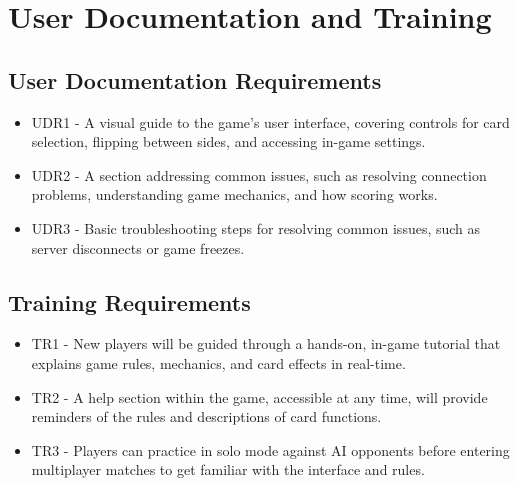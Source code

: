 \documentclass{article}
\begin{document}
\section{User Documentation and Training}

\subsection{User Documentation Requirements}
\begin{itemize}
    \item UDR1 - A visual guide to the game’s user interface, covering controls for card selection, flipping between sides, and accessing in-game settings.
    \item UDR2 - A section addressing common issues, such as resolving connection problems, understanding game mechanics, and how scoring works.
    \item UDR3 - Basic troubleshooting steps for resolving common issues, such as server disconnects or game freezes.
\end{itemize}

\subsection{Training Requirements}
\begin{itemize}
    \item TR1 - New players will be guided through a hands-on, in-game tutorial that explains game rules, mechanics, and card effects in real-time.
    \item TR2 - A help section within the game, accessible at any time, will provide reminders of the rules and descriptions of card functions.
    \item TR3 - Players can practice in solo mode against AI opponents before entering multiplayer matches to get familiar with the interface and rules.
\end{itemize}
\end{document}
